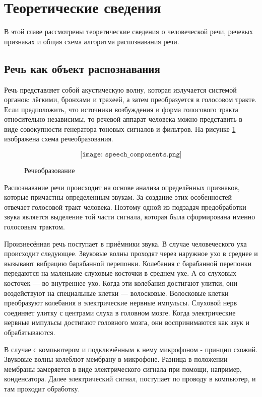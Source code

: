 \section{Теоретические сведения}
В этой главе рассмотрены теоретические сведения о человеческой речи, речевых признаках и общая схема алгоритма распознавания речи.

\subsection{Речь как объект распознавания}
Речь представляет собой акустическую волну, которая излучается системой органов: лёгкими, бронхами и трахеей, а затем преобразуется в голосовом тракте. Если предположить, что источники возбуждения и форма голосового тракта относительно независимы, то речевой аппарат человека можно представить в виде совокупности генератора тоновых сигналов и фильтров. На рисунке \ref{fig:speech_components} изображена схема речеобразования.

\begin{figure}[H]
	\[\texttt{[image: speech\_components.png]}\]
	\caption{Речеобразование}
	\label{fig:speech_components}
\end{figure}

Распознавание речи происходит на основе анализа определённых признаков, которые причастны определенным звукам. За создание этих особенностей отвечает голосовой тракт человека. Поэтому одной из подзадач предобработки звука является выделение той части сигнала, которая была сформирована именно голосовым трактом.

Произнесённая речь поступает в приёмники звука. В случае человеческого уха происходит следующее. Звуковые волны проходят через наружное ухо в среднее и вызывают вибрацию барабанной перепонки. Колебания с барабанной перепонки передаются на маленькие слуховые косточки в среднем ухе. А со слуховых косточек — во внутреннее ухо. Когда эти колебания достигают улитки, они воздействуют на специальные клетки — волосковые. Волосковые клетки преобразуют колебания в электрические нервные импульсы. Слуховой нерв соединяет улитку с центрами слуха в головном мозге. Когда электрические нервные импульсы достигают головного мозга, они воспринимаются как звук и обрабатываются.

В случае с компьютером и подключённым к нему микрофоном - принцип схожий. Звуковые волны колеблют мембрану в микрофоне. Разница в положении мембраны замеряется в виде электрического сигнала при помощи, например, конденсатора.  Далее электрический сигнал, поступает по проводу в компьютер, и там проходит обработку.


